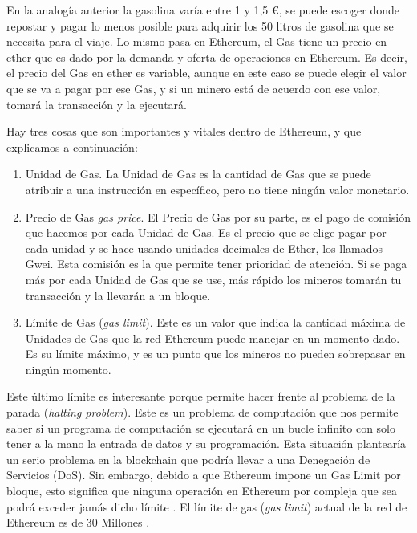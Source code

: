         En la analogía anterior la gasolina varía entre 1 y 1,5 €, se puede escoger donde repostar y pagar lo 
        menos 
        posible para adquirir los 50 litros de gasolina que se necesita para el viaje. Lo mismo pasa en 
        Ethereum, el Gas tiene un precio en ether que es dado por la demanda y oferta de operaciones en 
        Ethereum. Es decir, el precio del Gas en ether es variable, aunque en este caso se puede elegir el 
        valor que se va a pagar por ese Gas, y si un minero está de acuerdo con ese valor, tomará la 
        transacción y la ejecutará.


        Hay tres cosas que son importantes y vitales dentro de Ethereum, y que explicamos a continuación:


        \begin{enumerate}
          \item Unidad de Gas. La Unidad de Gas es la cantidad de Gas que se puede atribuir a una instrucción 
          en específico, pero no tiene ningún valor monetario.
          \item Precio de Gas \textit{gas price}. El Precio de Gas por su parte, es el pago de comisión que hacemos por cada 
          Unidad de Gas. Es el precio que se elige pagar por cada unidad y se hace usando unidades 
          decimales de Ether, los llamados Gwei. Esta comisión es la que permite tener prioridad de 
          atención. Si se paga más por cada Unidad de Gas que se use, más rápido los mineros tomarán tu 
          transacción y la llevarán a un bloque.
          \item Límite de Gas (\textit{gas limit}). Este es un valor que indica la cantidad máxima de Unidades de Gas que la red 
          Ethereum puede manejar en un momento dado. Es su límite máximo, y es un punto que los mineros no 
          pueden sobrepasar en ningún momento.
        \end{enumerate}


        Este último límite es interesante porque permite hacer frente al problema de la parada 
        (\textit{halting problem}). Este es un 
        problema de computación que nos permite saber si un programa de computación se ejecutará en un bucle 
        infinito con solo tener a la mano la entrada de datos y su programación. Esta situación plantearía un 
        serio problema en la blockchain que podría llevar a una Denegación de Servicios (DoS). Sin embargo, 
        debido a que Ethereum impone un Gas Limit por bloque, esto significa que ninguna operación en 
        Ethereum por compleja que sea podrá exceder jamás dicho límite \parencite{bit2meacademy}. El límite 
        de gas (\textit{gas limit}) actual de la red de Ethereum es de 30 Millones \parencite{ycharts}.


